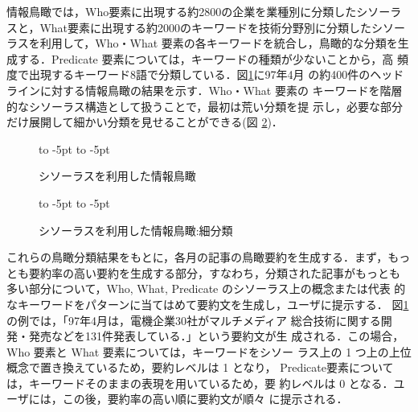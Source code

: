 情報鳥瞰では，Who要素に出現する約2800の企業を業種別に分類したシソーラ
スと，What要素に出現する約2000のキーワードを技術分野別に分類したシソー
ラスを利用して，Who・What 要素の各キーワードを統合し，鳥瞰的な分類を生
成する．Predicate 要素については，キーワードの種類が少ないことから，高
頻度で出現するキーワード8語で分類している．図\ref{fig:bview2}に97年4月
の約400件のヘッドラインに対する情報鳥瞰の結果を示す．Who・What 要素の
キーワードを階層的なシソーラス構造として扱うことで，最初は荒い分類を提
示し，必要な部分だけ展開して細かい分類を見せることができる(図
\ref{fig:bview3})．

\begin{figure}[tb]
  \vspace*{-20pt}
  \begin{center}
    \leavevmode
    \hbox to -5pt{\hss}
    \hbox to -5pt{\hss}
    \vspace*{-2pt}
    \caption{シソーラスを利用した情報鳥瞰}
    \vspace*{-6pt}
    \label{fig:bview2}
  \end{center}
\end{figure}


\begin{figure}[tb]
  \vspace*{-25pt}
  \begin{center}
    \leavevmode
    \hbox to -5pt{\hss}
    \hbox to -5pt{\hss}
    \vspace*{-10pt}
    \caption{シソーラスを利用した情報鳥瞰:細分類}
    
    \label{fig:bview3}
  \end{center}
\end{figure}

これらの鳥瞰分類結果をもとに，各月の記事の鳥瞰要約を生成する．まず，もっ
とも要約率の高い要約を生成する部分，すなわち，分類された記事がもっとも
多い部分について，Who, What, Predicate のシソーラス上の概念または代表
的なキーワードをパターンに当てはめて要約文を生成し，ユーザに提示する．
図\ref{fig:bview2}の例では，「97年4月は，電機企業30社がマルチメディア
総合技術に関する開発・発売などを131件発表している．」という要約文が生
成される．この場合，Who 要素と What 要素については，キーワードをシソー
ラス上の 1 つ上の上位概念で置き換えているため，要約レベルは 1 となり，
Predicate要素については，キーワードそのままの表現を用いているため，要
約レベルは 0 となる．ユーザには，この後，要約率の高い順に要約文が順々
に提示される．

\vspace{0.5cm}

